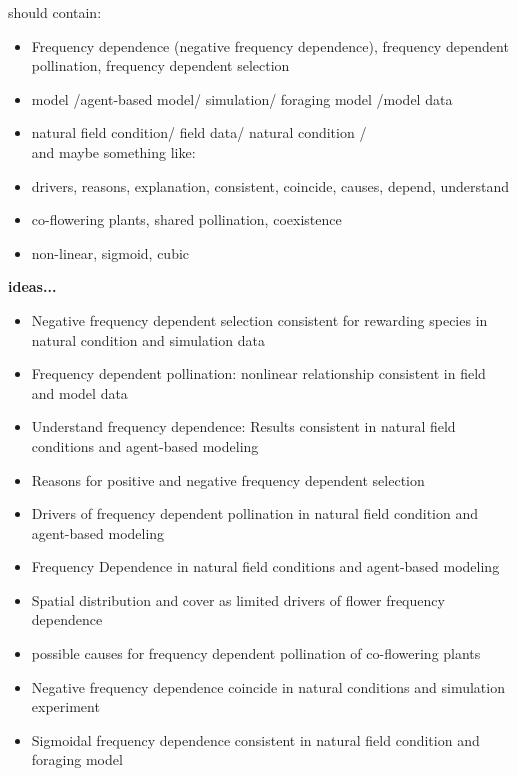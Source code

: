 \documentclass{article}
\begin{document}
should contain:
\begin{itemize}
\item Frequency dependence (negative frequency dependence), frequency dependent pollination, frequency dependent selection
\item model /agent-based model/ simulation/ foraging model /model data
\item natural field condition/ field data/ natural condition / \\

and maybe something like:
\item drivers, reasons, explanation, consistent, coincide, causes, depend, understand
\item co-flowering plants, shared pollination, coexistence
\item non-linear, sigmoid, cubic
\end{itemize}

\textbf{ideas...}
\begin{itemize}

\item Negative frequency dependent selection consistent for rewarding species in natural condition and simulation data

\item Frequency dependent pollination: nonlinear relationship consistent in field and model data

\item Understand frequency dependence: Results consistent in natural field conditions and agent-based modeling

\item  Reasons for positive and negative frequency dependent selection

\item Drivers of frequency dependent pollination in natural field condition and agent-based modeling

\item Frequency Dependence in natural field conditions and agent-based modeling

\item Spatial distribution and cover as limited drivers of flower frequency dependence

\item  possible causes for frequency dependent pollination of co-flowering plants 

\item  Negative frequency dependence coincide in natural conditions and simulation experiment

\item  Sigmoidal frequency dependence consistent in natural field condition and foraging model

\end{itemize}
\end{document}
